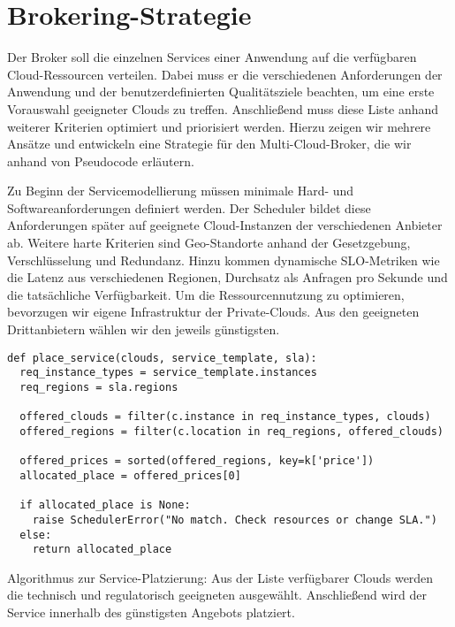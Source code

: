 \section{Brokering-Strategie}
\label{sec:brokering}

Der Broker soll die einzelnen Services einer Anwendung auf die verfügbaren Cloud-Ressourcen verteilen. Dabei muss er die verschiedenen Anforderungen der Anwendung und der benutzerdefinierten Qualitätsziele beachten, um eine erste Vorauswahl geeigneter Clouds zu treffen. Anschließend muss diese Liste anhand weiterer Kriterien optimiert und priorisiert werden. Hierzu zeigen wir mehrere Ansätze und entwickeln eine Strategie für den Multi-Cloud-Broker, die wir anhand von Pseudocode erläutern.

Zu Beginn der Servicemodellierung müssen minimale Hard- und Softwareanforderungen definiert werden. Der Scheduler bildet diese Anforderungen später auf geeignete Cloud-Instanzen der verschiedenen Anbieter ab. Weitere harte Kriterien sind Geo-Standorte anhand der Gesetzgebung, Verschlüsselung und Redundanz. Hinzu kommen dynamische SLO-Metriken wie die Latenz aus verschiedenen Regionen, Durchsatz als Anfragen pro Sekunde und die tatsächliche Verfügbarkeit. Um die Ressourcennutzung zu optimieren, bevorzugen wir eigene Infrastruktur der Private-Clouds. Aus den geeigneten Drittanbietern wählen wir den jeweils günstigsten.

\begin{listing}[ht]
\begin{verbatim}
def place_service(clouds, service_template, sla):
  req_instance_types = service_template.instances
  req_regions = sla.regions
	
  offered_clouds = filter(c.instance in req_instance_types, clouds)
  offered_regions = filter(c.location in req_regions, offered_clouds)
	
  offered_prices = sorted(offered_regions, key=k['price'])
  allocated_place = offered_prices[0]
	
  if allocated_place is None:
    raise SchedulerError("No match. Check resources or change SLA.")
  else:
    return allocated_place
\end{verbatim}
\caption{Algorithmus zur Service-Platzierung: Aus der Liste verfügbarer Clouds werden die technisch und regulatorisch geeigneten ausgewählt. Anschließend wird der Service innerhalb des günstigsten Angebots platziert.}
\label{listing:placing}
\end{listing}

